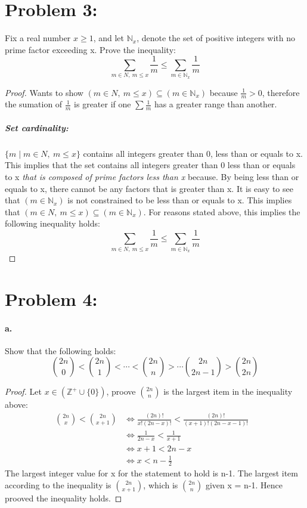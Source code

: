 \documentclass{article}
\begin{document}
\section*{Problem 3: }
Fix a real number $x \ge 1$, and let $\mathbb{N}_x$, denote the set of positive
integers with no prime factor exceeding x. Prove the inequality:
$$\sum_{m \in N,\ m \le x}\frac{1}{m} \le \sum_{m \in \mathbb{N}_x}\frac{1}{m}$$
\begin{proof}
Wants to show $(m \in N,\ m \le x) \subseteq (m \in \mathbb{N}_x)$ because 
$\frac{1}{m} > 0$, therefore the sumation of $\frac{1}{m}$ is greater if one
$\sum \frac{1}{m}$ has a greater range than another.
\subparagraph {Set cardinality: } $\{m \mid m \in N,\ m \le x\}$ contains all integers
greater than 0, less than or equals to x. This implies that the set contains 
all integers greater than 0 less than or equals to x 
\textit{that is composed of prime factors less than x} because. By being less
than or equals to x, there cannot be any factors that is greater than x.
It is easy to see that $(m \in \mathbb{N}_x)$ is not constrained to be less 
than or equals to x. This implies that $(m \in N,\ m \le x) \subseteq (m \in
\mathbb{N}_x)$. For reasons stated above, this implies the following inequality
holds:
$$\sum_{m \in N,\ m \le x}\frac{1}{m} \le \sum_{m \in \mathbb{N}_x}\frac{1}{m}$$
\end{proof}

\section*{Problem 4: }
	\paragraph{a. }Show that the following holds:
		$${2n \choose 0} < {2n \choose 1} < \cdots < {2n \choose n} > \cdots {2n \choose
		2n-1} > {2n \choose 2n}$$

		\begin{proof}
		Let $x\in (\mathbb{Z^+} \cup \{0\})$, proove $2n \choose n$ is the largest item 
		in the inequality above:
		\begin{align*}
			{2n \choose x} < {2n \choose x+1} &\Leftrightarrow \frac{(2n)!}{x!(2n-x)!} <
			\frac{(2n)!}{(x+1)!(2n-x-1)!} &\\
			&\Leftrightarrow \frac{1}{2n-x} <
			\frac{1}{x+1} &\\
			&\Leftrightarrow x+1 < 2n-x &\\
			&\Leftrightarrow x < n-\frac{1}{2}
		\end{align*}
		The largest integer value for x for the statement to hold is n-1. The largest
		item according to the inequality is $2n \choose x+1$, which is $2n \choose n$
		given x = n-1. Hence prooved the inequality holds.
		\end{proof}
\end{document}

